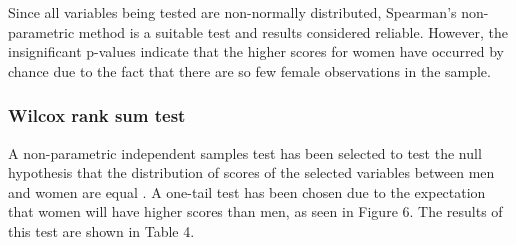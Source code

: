 Since all variables being tested are non-normally distributed, Spearman's non-parametric method is a suitable test and results considered reliable. However, the insignificant p-values indicate that the higher scores for women have occurred by chance due to the fact that there are so few female observations in the sample.



\subsubsection{Wilcox rank sum test}


A non-parametric independent samples test has been selected to test the null hypothesis that the distribution of scores of the selected variables between men and women are equal \citep{Coolican2014}. A one-tail test has been chosen due to the expectation that women will have higher scores than men, as seen in Figure 6. The results of this test are shown in Table 4. 


